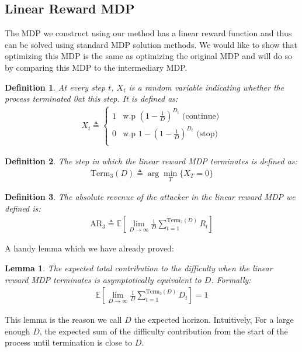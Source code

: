 \documentclass{article}
\newcommand{\E}[1]{\mathbb{E} \left[ #1 \right]}
\newtheorem{definition}{Definition}
\newtheorem{lemma}[theorem]{Lemma}
\begin{document}
\subsection{Linear Reward MDP}
The MDP we construct using our method has a linear reward function and thus can be solved using standard MDP solution methods. We would like to show that optimizing this MDP is the same as optimizing the original MDP and will do so by comparing this MDP to the intermediary MDP.
\begin{definition}
    At every step $t$, $X_t$ is a random variable indicating whether the process terminated 0at this step. It is defined as:
    \begin{gather*}
        X_t \triangleq
        \begin{cases}
            1 & \text{w.p } \left( 1 -\frac{1}{D} \right)^{D_t} \text{ (continue)} \\
            0 & \text{w.p } 1 - \left( 1 -\frac{1}{D} \right)^{D_t} \text{ (stop)} \\
            \end{cases}
    \end{gather*}
\end{definition}
\begin{definition}
    The step in which the linear reward MDP terminates is defined as:
    \begin{gather*}
        \text{Term}_3(D) \triangleq \arg \min\limits_T \{ X_T = 0 \}
    \end{gather*}
\end{definition}
\begin{definition}
    The absolute revenue of the attacker in the linear reward MDP we defined is:
    \begin{gather*}
         \text{AR}_3 \triangleq \E{\lim\limits_{D\to\infty} \frac{1}{D}\sum\limits_{t=1}^{\text{Term}_3(D)} R_t}
    \end{gather*}
\end{definition}
A handy lemma which we have already proved:
\begin{lemma}
    The expected total contribution to the difficulty when the linear reward MDP terminates is asymptotically equivalent to $D$. Formally:
    \begin{gather*}
        \E{\lim\limits_{D\to\infty} \frac{1}{D} \sum\limits_{t=1}^{\text{Term}_3(D)} D_t} = 1
    \end{gather*}
\end{lemma}
This lemma is the reason we call $D$ the expected horizon. Intuitively, For a large enough $D$, the expected sum of the difficulty contribution from the start of the process until termination is close to $D$.
\end{document}
